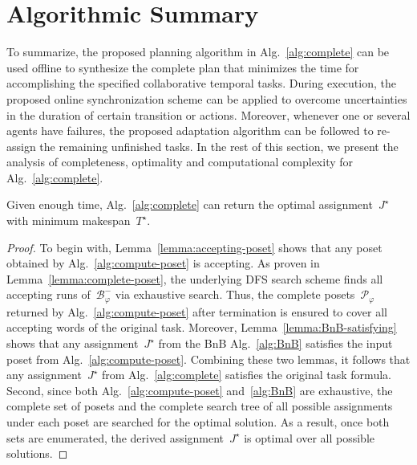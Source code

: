 \section{Algorithmic Summary}\label{subsec:summary}

To summarize, the proposed planning algorithm in Alg.~\ref{alg:complete}
can be used offline to synthesize the complete plan that
minimizes the time for accomplishing the specified collaborative temporal tasks.
During execution, the proposed online synchronization scheme can be applied to
overcome uncertainties in the duration of certain transition or actions.
Moreover, whenever one or several agents have failures, the proposed adaptation
algorithm can be followed to re-assign the remaining unfinished tasks.
In the rest of this section,
we present the analysis of completeness, optimality and computational
complexity for Alg.~\ref{alg:complete}.

\begin{theorem}[Completeness]\label{theo:completeness}
Given enough time, Alg.~\ref{alg:complete} can return the optimal
assignment~$J^\star$ with minimum makespan~$T^\star$.
\end{theorem}
\begin{proof}
 To begin with, Lemma~\ref{lemma:accepting-poset} shows that any poset obtained
 by Alg.~\ref{alg:compute-poset} is accepting.
 As proven in Lemma~\ref{lemma:complete-poset},
 the underlying DFS search scheme finds all accepting runs of~$\mathcal{B}^-_{\varphi}$ via exhaustive search.
 Thus, the complete posets~$\mathcal{P}_{\varphi}$ returned by
 Alg.~\ref{alg:compute-poset} after termination is ensured to cover all
 accepting words of the original task.
 Moreover, Lemma~\ref{lemma:BnB-satisfying} shows that any assignment~$J^\star$
 from the BnB Alg.~\ref{alg:BnB} satisfies the input poset
 from Alg.~\ref{alg:compute-poset}.
 Combining these two lemmas, it follows that any assignment~$J^\star$
 from Alg.~\ref{alg:complete} satisfies the original task formula.
 Second, since both Alg.~\ref{alg:compute-poset} and~\ref{alg:BnB} are exhaustive,
 the complete set of posets and the complete search tree of all
 possible assignments under each poset are searched for the optimal solution.
 As a result, once both sets are enumerated, the derived assignment~$J^\star$ is
 optimal over all possible solutions.
\end{proof}

